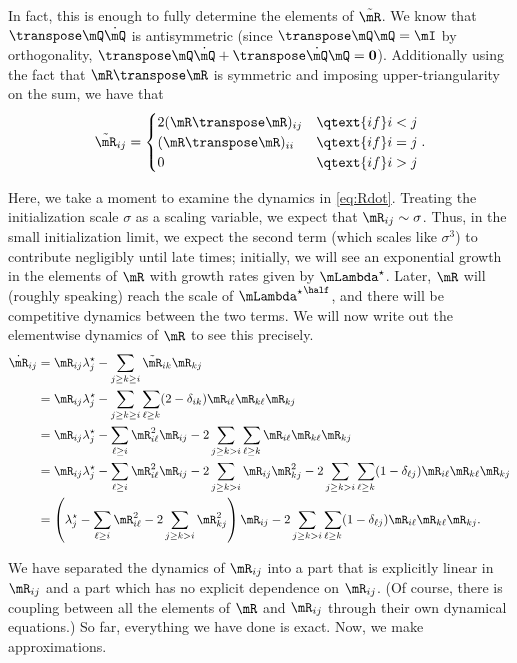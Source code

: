 In fact, this is enough to fully determine the elements of $\tilde\mR$. We know that $\T\mQ\dot\mQ$ is antisymmetric (since $\T\mQ\mQ=\mI$ by orthogonality, $\T\mQ\dot\mQ + \T{\dot\mQ}\mQ=\mathbf{0}$). Additionally using the fact that $\mR\T\mR$ is symmetric and imposing upper-triangularity on the sum, we have that
\begin{equation}
    \tilde\mR_{ij} =
    \begin{cases}
        2(\mR\T\mR)_{ij} &\qtext{if} i < j\\
        (\mR\T\mR)_{ii} &\qtext{if} i = j\\
        0 &\qtext{if} i > j\\
    \end{cases}.
\end{equation}

Here, we take a moment to examine the dynamics in \cref{eq:Rdot}. Treating the initialization scale $\sigma$ as a scaling variable, we expect that $\mR_{ij}\sim\sigma$. Thus, in the small initialization limit, we expect the second term (which scales like $\sigma^3$) to contribute negligibly until late times; initially, we will see an exponential growth in the elements of $\mR$ with growth rates given by $\Lstar$. Later, $\mR$ will (roughly speaking) reach the scale of ${\Lstar}^\half$, and there will be competitive dynamics between the two terms. We will now write out the elementwise dynamics of $\mR$ to see this precisely.
\begin{align}
    \dot\mR_{ij} &= \mR_{ij}\lambda^\star_j - \sum_{ j\geq k \geq i}\tilde\mR_{ik} \mR_{kj} \\
    &= \mR_{ij}\lambda^\star_j - \sum_{j\geq k \geq i} \sum_{\ell\geq k} (2-\delta_{ik})\mR_{i\ell}\mR_{k\ell}\mR_{kj} \\
    &= \mR_{ij}\lambda^\star_j - \sum_{\ell\geq i} \mR_{i\ell}^2\mR_{ij} - 2\sum_{j\geq k > i} \sum_{\ell\geq k} \mR_{i\ell}\mR_{k\ell}\mR_{kj} \\
    &= \mR_{ij}\lambda^\star_j - \sum_{\ell\geq i} \mR_{i\ell}^2\mR_{ij} - 2\sum_{j\geq k > i} \mR_{ij}\mR_{kj}^2
    - 2\sum_{j\geq k > i} \sum_{\ell\geq k} (1-\delta_{\ell j})\mR_{i\ell}\mR_{k\ell}\mR_{kj} \\
    &= \left(\lambda^\star_j - \sum_{\ell\geq i} \mR_{i\ell}^2 - 2\sum_{j\geq k > i} \mR_{kj}^2 \right)\mR_{ij}
    - 2\sum_{j\geq k > i} \sum_{\ell\geq k} (1-\delta_{\ell j})\mR_{i\ell}\mR_{k\ell}\mR_{kj}.
\end{align}

We have separated the dynamics of $\mR_{ij}$ into a part that is explicitly linear in $\mR_{ij}$ and a part which has no explicit dependence on $\mR_{ij}$. (Of course, there is coupling between all the elements of $\mR$ and $\mR_{ij}$ through their own dynamical equations.) So far, everything we have done is exact. Now, we make approximations.

